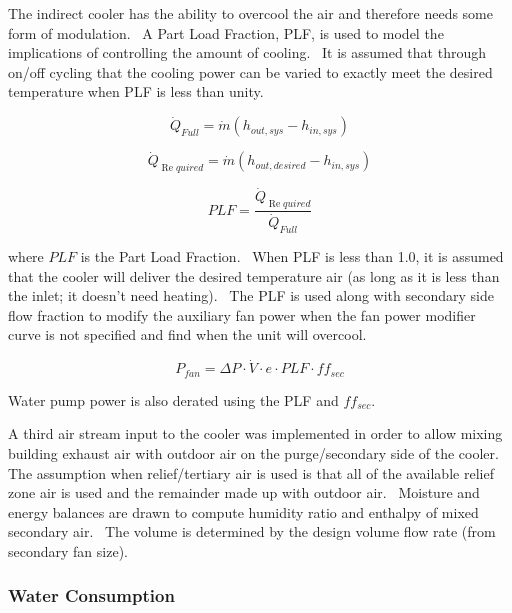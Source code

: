 The indirect cooler has the ability to overcool the air and therefore needs some form of modulation.~ A Part Load Fraction, PLF, is used to model the implications of controlling the amount of cooling.~ It is assumed that through on/off cycling that the cooling power can be varied to exactly meet the desired temperature when PLF is less than unity.

\begin{equation}
{\dot Q_{Full}} = \dot m\left( {{h_{out,sys}} - {h_{in,sys}}} \right)
\end{equation}

\begin{equation}
{\dot Q_{\operatorname{Re} quired}} = \dot m\left( {{h_{out,desired}} - {h_{in,sys}}} \right)
\end{equation}

\begin{equation}
PLF = \frac{{{{\dot Q}_{\operatorname{Re} quired}}}}{{{{\dot Q}_{Full}}}}
\end{equation}

where \(PLF\) is the Part Load Fraction.~ When PLF is less than 1.0, it is assumed that the cooler will deliver the desired temperature air (as long as it is less than the inlet; it doesn't need heating).~ The PLF is used along with secondary side flow fraction to modify the auxiliary fan power when the fan power modifier curve is not specified and find when the unit will overcool.

\begin{equation}
{P_{fan}} = \Delta P\cdot \dot V\cdot e\cdot PLF\cdot ff_{sec}
\end{equation}

Water pump power is also derated using the PLF and \(ff_{sec}\).

A third air stream input to the cooler was implemented in order to allow mixing building exhaust air with outdoor air on the purge/secondary side of the cooler. The assumption when relief/tertiary air is used is that all of the available relief zone air is used and the remainder made up with outdoor air.~ Moisture and energy balances are drawn to compute humidity ratio and enthalpy of mixed secondary air.~ The volume is determined by the design volume flow rate (from secondary fan size).

\subsubsection{Water Consumption}\label{water-consumption}

